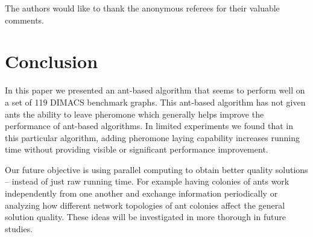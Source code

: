 \documentclass[11pt]{article}
\begin{document}
The authors would like to thank the anonymous referees for their valuable comments.

\section{Conclusion}\label{conclusion}


  
In this paper we presented an ant-based algorithm that seems to perform well
on a set of 119 DIMACS benchmark graphs.  This ant-based algorithm has not given ants
the ability to leave pheromone which generally helps improve the performance
of ant-based algorithms.  In limited experiments we found that in this
particular algorithm, adding pheromone laying capability increases
running time without providing visible or significant performance
improvement. 


Our future objective is using parallel computing to obtain better quality solutions -- instead of just raw running time.  For example having colonies of ants work independently from one another and exchange information periodically or analyzing how different network topologies of ant colonies affect the general solution quality. These ideas will be investigated in more thorough in future studies.





\end{document}
